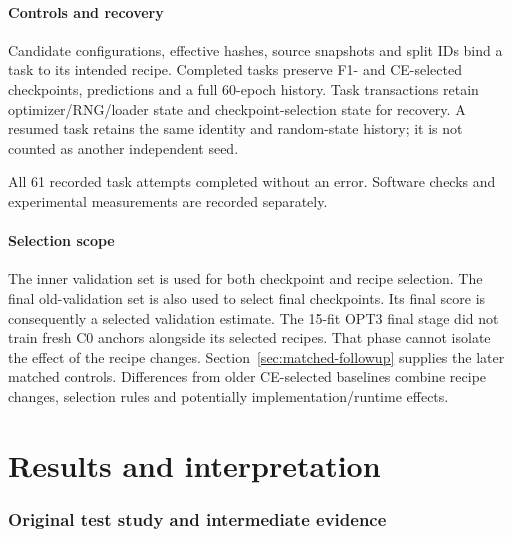 \subsection{Controls and recovery}
Candidate configurations, effective hashes, source snapshots and split IDs bind a task to its intended recipe. Completed tasks preserve F1- and CE-selected checkpoints, predictions and a full 60-epoch history. Task transactions retain optimizer/RNG/loader state and checkpoint-selection state for recovery. A resumed task retains the same identity and random-state history; it is not counted as another independent seed.

All 61 recorded task attempts completed without an error. Software checks and experimental measurements are recorded separately.

\subsection{Selection scope}
The inner validation set is used for both checkpoint and recipe selection. The final old-validation set is also used to select final checkpoints. Its final score is consequently a selected validation estimate. The 15-fit OPT3 final stage did not train fresh C0 anchors alongside its selected recipes. That phase cannot isolate the effect of the recipe changes. Section~\ref{sec:matched-followup} supplies the later matched controls. Differences from older CE-selected baselines combine recipe changes, selection rules and potentially implementation/runtime effects.

\clearpage
\part{Results and interpretation}
\section{Original test study and intermediate evidence}

